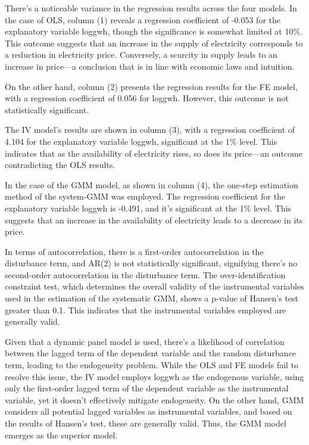 \documentclass[12pt]{article}
\begin{document}
There's a noticeable variance in the regression results across the four models. In the case of OLS, column (1) reveals a regression coefficient of -0.053 for the explanatory variable loggwh, though the significance is somewhat limited at 10\%. This outcome suggests that an increase in the supply of electricity corresponds to a reduction in electricity price. Conversely, a scarcity in supply leads to an increase in price—a conclusion that is in line with economic laws and intuition.

On the other hand, column (2) presents the regression results for the FE model, with a regression coefficient of 0.056 for loggwh. However, this outcome is not statistically significant.

The IV model's results are shown in column (3), with a regression coefficient of 4.104 for the explanatory variable loggwh, significant at the 1\% level. This indicates that as the availability of electricity rises, so does its price—an outcome contradicting the OLS results.

In the case of the GMM model, as shown in column (4), the one-step estimation method of the system-GMM was employed. The regression coefficient for the explanatory variable loggwh is -0.491, and it's significant at the 1\% level. This suggests that an increase in the availability of electricity leads to a decrease in its price.

In terms of autocorrelation, there is a first-order autocorrelation in the disturbance term, and AR(2) is not statistically significant, signifying there's no second-order autocorrelation in the disturbance term. The over-identification constraint test, which determines the overall validity of the instrumental variables used in the estimation of the systematic GMM, shows a p-value of Hansen's test greater than 0.1. This indicates that the instrumental variables employed are generally valid.

Given that a dynamic panel model is used, there's a likelihood of correlation between the lagged term of the dependent variable and the random disturbance term, leading to the endogeneity problem. While the OLS and FE models fail to resolve this issue, the IV model employs loggwh as the endogenous variable, using only the first-order lagged term of the dependent variable as the instrumental variable, yet it doesn't effectively mitigate endogeneity. On the other hand, GMM considers all potential lagged variables as instrumental variables, and based on the results of Hansen's test, these are generally valid. Thus, the GMM model emerges as the superior model.
\end{document}
